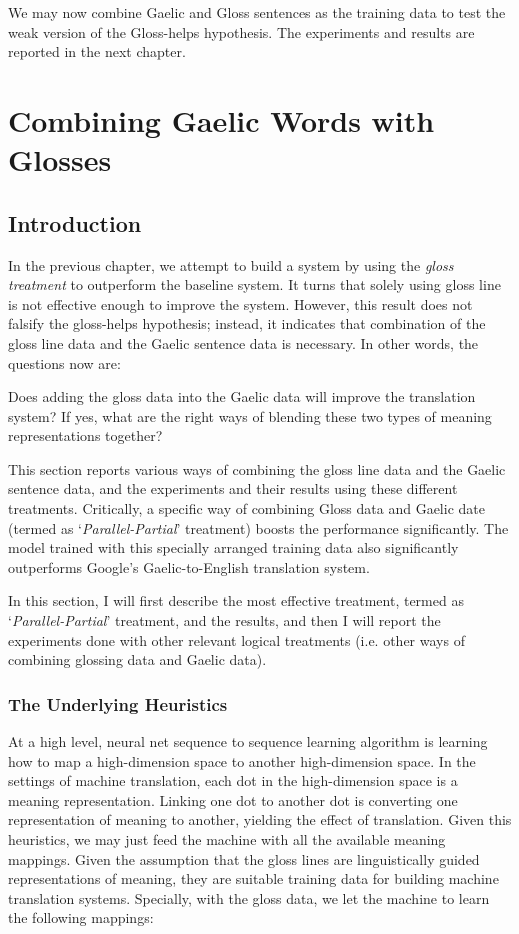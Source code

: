 \documentclass[final]{ua-thesis}
\numberwithin{equation}{section}
\begin{document}
We may now combine Gaelic and Gloss sentences as the training data to test the weak version of the Gloss-helps hypothesis. The experiments and results are reported in the next chapter.
\chapter{Combining Gaelic Words with Glosses}\label{chap:cake2}
\section{Introduction}
In the previous chapter, we attempt to build a system by using the \textit{gloss treatment} to outperform the baseline system. It turns that solely using gloss line is not effective enough to improve the system. However, this result does not falsify the gloss-helps hypothesis; instead, it indicates that combination of the gloss line data and the Gaelic sentence data is necessary. In other words, the questions now are: 
\begin{exe}
	\ex 
	\begin{xlist}
		\ex Does adding the gloss data into the Gaelic data will improve the translation system? 
		\ex If yes, what are the right ways of blending these two types of meaning representations together? 
	\end{xlist}	
\end{exe}

This section reports various ways of combining the gloss line data and the Gaelic sentence data, and the experiments and their results using these different treatments. Critically, a specific way of combining Gloss data and Gaelic date (termed as `\textit{Parallel-Partial}' treatment) boosts the performance significantly. The model trained with this specially arranged training data also significantly outperforms Google's Gaelic-to-English translation system.

In this section, I will first describe the most effective treatment, termed as `\textit{Parallel-Partial}' treatment, and the results, and then I will report the experiments done with other relevant logical treatments (i.e. other ways of combining glossing data and Gaelic data). 

\subsection{The Underlying Heuristics}\label{heuristics}
At a high level, neural net sequence to sequence learning algorithm is learning how to map a high-dimension space to another high-dimension space. In the settings of machine translation, each dot in the high-dimension space is a meaning representation. Linking one dot to another dot is converting one representation of meaning to another, yielding the effect of translation. Given this heuristics, we may just feed the machine with all the available meaning mappings. Given the assumption that the gloss lines are linguistically guided representations of meaning, they are suitable training data for building machine translation systems. Specially, with the gloss data, we let the machine to learn the following mappings:
\end{document}
